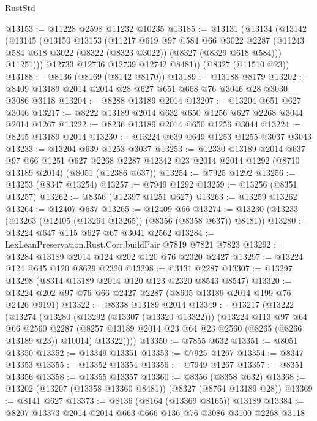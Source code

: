 \begin{lexlean}{RustStd}
\begin{coremodule}
@13153 := @11228 @2598 @11232 @10235
@13185 := @13131
    (@13134
      (@13142
        (@13145
          (@13150
            @13153
            (@11217
              @619
              @97
              @584
              @66
              @3022
              @2287
              (@11243 @584 @618 @3022 (@8322 (@8323 @3022)) (@8327 (@8329 @618 @584)))
              @11251)))
        @12733
        @12736
        @12739
        @12742
        @8481))
    (@8327 (@11510 @23))
@13188 := @8136 (@8169 (@8142 @8170))
@13189 := @13188 @8179
@13202 := @8409 @13189 @2014 @2014 @28 @627 @651 @668 @76 @3046 @28 @3030 @3086 @3118
@13204 := @8288 @13189 @2014
@13207 := @13204 @651 @627 @3046
@13217 := @8222 @13189 @2014 @632 @650 @1256 @627 @2268 @3044 @2014 @1267
@13222 := @8236 @13189 @2014 @650 @1256 @3044
@13224 := @8245 @13189 @2014
@13230 := @13224 @639 @649 @1253 @1255 @3037 @3043
@13233 := @13204 @639 @1253 @3037
@13253 := @12330
    @13189
    @2014
    @637
    @97
    @66
    @1251
    @627
    @2268
    @2287
    @12342
    @23
    @2014
    @2014
    @1292
    (@8710 @13189 @2014)
    (@8051 (@12386 @637))
@13254 := @7925 @1292
@13256 := @13253 (@8347 @13254)
@13257 := @7949 @1292
@13259 := @13256 (@8351 @13257)
@13262 := @8356 (@12397 @1251 @627)
@13263 := @13259 @13262
@13264 := @12407 @637
@13265 := @12409 @66
@13274 := @13230 (@13233 (@13263 (@12405 (@13264 @13265)) (@8356 (@8358 @637)) @8481))
@13280 := @13224 @647 @115 @627 @67 @3041 @2562
@13284 := LexLeanPreservation.Rust.Corr.buildPair @7819 @7821 @7823
@13292 := @13284 @13189 @2014 @124 @202 @120 @76 @2320 @2427
@13297 := @13224 @124 @645 @120 @8629 @2320
@13298 := @3131 @2287
@13307 := @13297 @13298 (@8314 @13189 @2014 @120 @123 @2320 @8543 @8547)
@13320 := @13224 @202 @97 @76 @66 @2427 @2287 (@8605 @13189 @2014 @199 @76 @2426 @9191)
@13322 := @8338 @13189 @2014
@13349 := @13217
    (@13222
      (@13274
        (@13280
          (@13292 (@13307 (@13320 @13322)))
          (@13224
            @113
            @97
            @64
            @66
            @2560
            @2287
            (@8257 @13189 @2014 @23 @64 @23 @2560 (@8265 (@8266 @13189 @23)) @10014)
            @13322))))
@13350 := @7855 @632
@13351 := @8051 @13350
@13352 := @13349 @13351
@13353 := @7925 @1267
@13354 := @8347 @13353
@13355 := @13352 @13354
@13356 := @7949 @1267
@13357 := @8351 @13356
@13358 := @13355 @13357
@13360 := @8356 (@8358 @632)
@13368 := @13202 (@13207 (@13358 @13360 @8481)) (@8327 (@8764 @13189 @28))
@13369 := @8141 @627
@13373 := @8136 (@8164 (@13369 @8165)) @13189
@13384 := @8207 @13373 @2014 @2014 @663 @666 @136 @76 @3086 @3100 @2268 @3118

\end{coremodule}
\end{lexlean}
